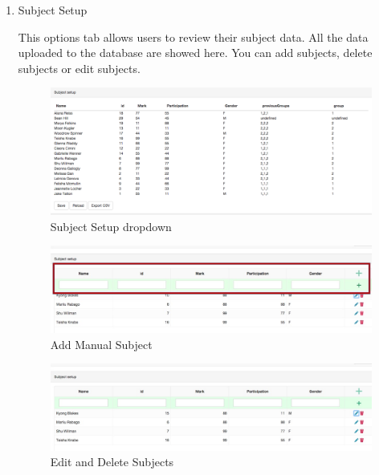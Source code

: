 \begin{enumerate}
\newpage
\item Subject Setup\par
This options tab allows users to review their subject data. All the data uploaded to the database are showed here. You can add subjects, delete subjects or edit subjects.\par
 \begin{figure}[H] 
	\centering
	\includegraphics[width=13cm]{./graphics/SubjectSetup.jpg}\par
	\caption{Subject Setup dropdown}
\end{figure}
\begin{figure}[H] 
	\centering
	\includegraphics[width=13cm]{./graphics/AddManualSubject.jpg}\par
	\caption{Add Manual Subject}
\end{figure}
 \begin{figure}[H] 
	\centering
	\includegraphics[width=13cm]{./graphics/EditAndDeleteSubject.jpg}\par
	\caption{Edit and Delete Subjects}
\end{figure}


\end{enumerate}

